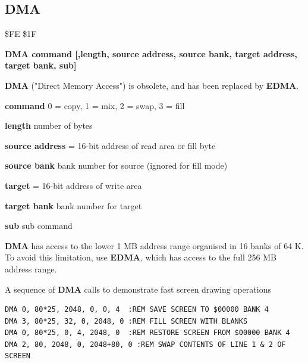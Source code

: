 \subsection{DMA}
\label{BASIC 65 Commands!DMA}
\begin{description}[leftmargin=2cm,style=nextline]
\item [Token:] \$FE \$1F
\item [Format:] {\bf DMA command [,length, source address,
                 source bank, target address, target bank, sub]}
\item [Usage:]
   {\bf DMA} ("Direct Memory Access") is obsolete,
   and has been replaced by {\bf EDMA}.

   {\bf command} 0 = copy, 1 = mix, 2 = swap, 3 = fill

   {\bf length} number of bytes

   {\bf source address} = 16-bit address of read area or fill byte

   {\bf source bank} bank number for source (ignored for fill mode)

   {\bf target} = 16-bit address of write area

   {\bf target bank} bank number for target

   {\bf sub} sub command

\item [Remarks:]
{\bf DMA} has access to the lower 1 MB address range
organised in 16 banks of 64 K. To avoid this limitation, use
{\bf EDMA}, which has access to the full 256 MB address range.

\item [Examples:] A sequence of {\bf DMA} calls to demonstrate fast screen drawing operations
\begin{tcolorbox}[colback=black,coltext=white]
\verbatimfont{\codefont}
\begin{verbatim}
DMA 0, 80*25, 2048, 0, 0, 4  :REM SAVE SCREEN TO $00000 BANK 4
DMA 3, 80*25, 32, 0, 2048, 0 :REM FILL SCREEN WITH BLANKS
DMA 0, 80*25, 0, 4, 2048, 0  :REM RESTORE SCREEN FROM $00000 BANK 4
DMA 2, 80, 2048, 0, 2048+80, 0 :REM SWAP CONTENTS OF LINE 1 & 2 OF SCREEN
\end{verbatim}
\end{tcolorbox}
\end{description}


\newpage

